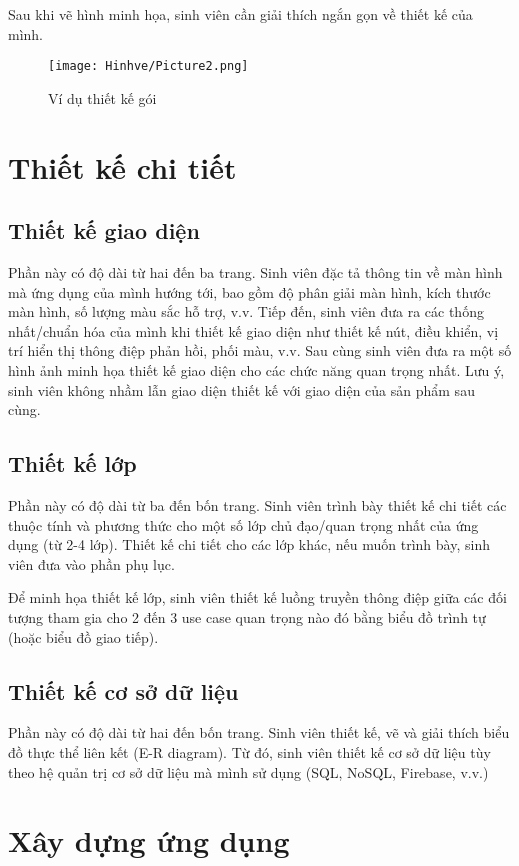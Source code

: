 \documentclass[../DoAn.tex]{subfiles}
\begin{document}
Sau khi vẽ hình minh họa, sinh viên cần giải thích ngắn gọn về thiết kế của mình. 

\begin{figure}[H]
    \centering
    \texttt{[image: Hinhve/Picture2.png]}
    \caption{Ví dụ thiết kế gói}
    \label{fig:Fig2}
\end{figure}

\section{Thiết kế chi tiết}
\subsection{Thiết kế giao diện}
Phần này có độ dài từ hai đến ba trang. Sinh viên đặc tả thông tin về màn hình mà ứng dụng của mình hướng tới, bao gồm độ phân giải màn hình, kích thước màn hình, số lượng màu sắc hỗ trợ, v.v. Tiếp đến, sinh viên đưa ra các thống nhất/chuẩn hóa của mình khi thiết kế giao diện như thiết kế nút, điều khiển, vị trí hiển thị thông điệp phản hồi, phối màu, v.v. Sau cùng sinh viên đưa ra một số hình ảnh minh họa thiết kế giao diện cho các chức năng quan trọng nhất. Lưu ý, sinh viên không nhầm lẫn giao diện thiết kế với giao diện của sản phẩm sau cùng.
\subsection{Thiết kế lớp}
Phần này có độ dài từ ba đến bốn trang. Sinh viên trình bày thiết kế chi tiết các thuộc tính và phương thức cho một số lớp chủ đạo/quan trọng nhất của ứng dụng (từ 2-4 lớp). Thiết kế chi tiết cho các lớp khác, nếu muốn trình bày, sinh viên đưa vào phần phụ lục.

Để minh họa thiết kế lớp, sinh viên thiết kế luồng truyền thông điệp giữa các đối tượng tham gia cho 2 đến 3 use case quan trọng nào đó bằng biểu đồ trình tự (hoặc biểu đồ giao tiếp).
\subsection{Thiết kế cơ sở dữ liệu}
Phần này có độ dài từ hai đến bốn trang. Sinh viên thiết kế, vẽ và giải thích biểu đồ thực thể liên kết (E-R diagram). Từ đó, sinh viên thiết kế cơ sở dữ liệu tùy theo hệ quản trị cơ sở dữ liệu mà mình sử dụng (SQL, NoSQL, Firebase, v.v.)

\section{Xây dựng ứng dụng}
\end{document}
